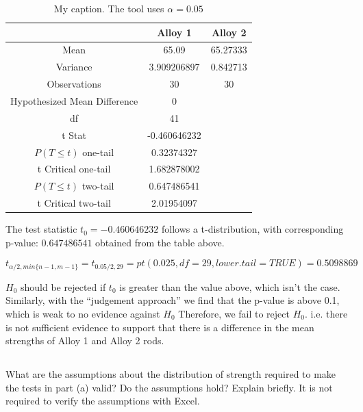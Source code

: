 \documentclass[letterpaper]{article}
\begin{document}
\begin{table}[H]
 \centering
 \begin{tabular}{c|c|c|}
                               & Alloy 1      & Alloy 2  \\ \hline
  Mean                         & 65.09        & 65.27333 \\ \hline
  Variance                     & 3.909206897  & 0.842713 \\ \hline
  Observations                 & 30           & 30       \\ \hline
  Hypothesized Mean Difference & 0            &          \\ \hline
  df                           & 41           &          \\ \hline
  t Stat                       & -0.460646232 &          \\ \hline
  $P(T \leq t)$ one-tail       & 0.32374327   &          \\ \hline
  t Critical one-tail          & 1.682878002  &          \\ \hline
  $P(T \leq t)$ two-tail       & 0.647486541  &          \\ \hline
  t Critical two-tail          & 2.01954097   &          \\ \hline
 \end{tabular}
 \caption{My caption. The tool uses $\alpha = 0.05$}
 \label{5a}
\end{table}

The test statistic $t_0 = -0.460646232$ follows a t-distribution, with
corresponding p-value: $0.647486541$ obtained from the table above.

$$t_{\alpha/2, min\{n-1, m-1\}} = t_{0.05/2, 29} = pt(0.025, df=29, lower.tail=TRUE) = 0.5098869$$

$H_0$ should be rejected if $t_0$ is greater than the value above, which isn't
the case. Similarly, with the ``judgement approach'' we find that the p-value is
above 0.1, which is weak to no evidence against $H_0$ Therefore, we fail to
reject $H_0$. i.e. there is not sufficient evidence to support that there is a
difference in the mean strengths of Alloy 1 and Alloy 2 rods.

\subsection{}%
What are the assumptions about the distribution of strength required to make the
tests in part (a) valid?  Do the assumptions hold?  Explain briefly. It is not
required to verify the assumptions with Excel.
\end{document}
